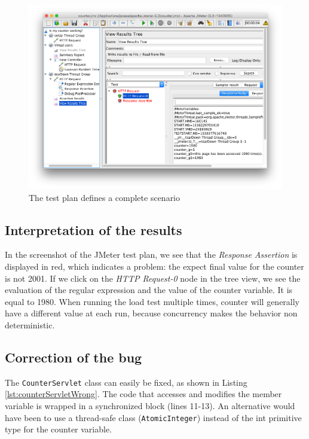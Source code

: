 \begin{figure}[]
	\centerline{\includegraphics[width=1.3\linewidth]{Figures/screenshot-jmeter-servlet-counter-bug.png}}
	\caption{The test plan defines a complete scenario}
  \label{fig:screenshot-jmeter-servlet-counter-bug}
\end{figure}

\subsection{Interpretation of the results}

In the screenshot of the JMeter test plan, we see that the \emph{Response Assertion} is displayed in red, which indicates a problem: the expect final value for the counter is not 2001. If we click on the \emph{HTTP Request-0} node in the tree view, we see the evaluation of the regular expression and the value of the counter variable. It is equal to 1980. When running the load test multiple times, counter will generally have a different value at each run, because concurrency makes the behavior non deterministic. 

\subsection{Correction of the bug}

The \texttt{CounterServlet} class can easily be fixed, as shown in Listing \ref{lst:counterServletWrong}. The code that accesses and modifies the member variable is wrapped in a synchronized block (lines 11-13). An alternative would have been to use a thread-safe class (\texttt{AtomicInteger}) instead of the int primitive type for the counter variable.

